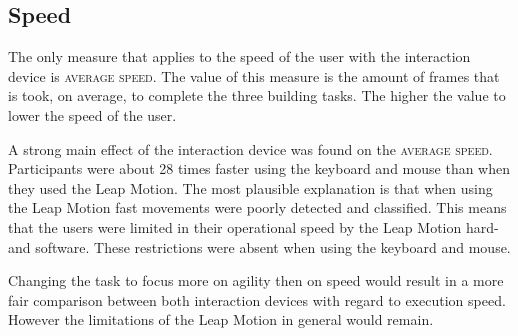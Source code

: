 \subsection{Speed}

The only measure that applies to the speed of the user with the interaction device is \textsc{average speed}. The value of this measure is the amount of frames that is took, 
on average, to complete the three building tasks. The higher the value to lower the speed of the user. 

A strong main effect of the interaction device was found on the \textsc{average speed}. Participants were about 28 times faster using the keyboard and mouse than when 
they used the Leap Motion. The most plausible explanation is that when using the Leap Motion fast movements were poorly detected and classified. This means that the users 
were limited in their operational speed by the Leap Motion hard- and software. These restrictions were absent when using the keyboard and mouse. 

Changing the task to focus more on agility then on speed would result in a more fair comparison between both interaction devices with regard to execution speed. However 
the limitations of the Leap Motion in general would remain. 
